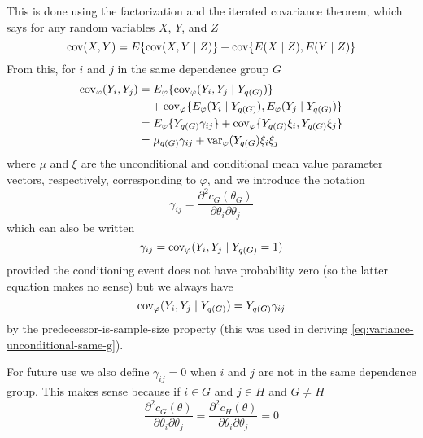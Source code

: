 This is done using the factorization and the iterated covariance theorem,
which says for any random variables $X$, $Y$, and $Z$
$$
   \operatorname{cov}(X, Y) = E\{ \operatorname{cov}(X, Y \mid Z) \} + \operatorname{cov}\{E(X \mid Z), E(Y \mid Z)\}
$$
From this, for $i$ and $j$ in the same dependence group $G$
\begin{equation}
\begin{split} \label{eq:variance-unconditional-same-g}
   \operatorname{cov}_\varphi(Y_i, Y_j)
   & =
   E_\varphi\{ \operatorname{cov}_\varphi(Y_i, Y_j \mid Y_{q(G)}) \}
   \\
   & \quad
   + \operatorname{cov}_\varphi\{E_\varphi(Y_i \mid Y_{q(G)}), E_\varphi(Y_j \mid Y_{q(G)})\}
   \\
   & =
   E_\varphi\{ Y_{q(G)} \gamma_{i j} \}
   + \operatorname{cov}_\varphi\{ Y_{q(G)} \xi_i, Y_{q(G)} \xi_j\}
   \\
   & =
   \mu_{q(G)} \gamma_{i j} + \operatorname{var}_\varphi(Y_{q(G}) \xi_i \xi_j
\end{split}
\end{equation}
where $\mu$ and $\xi$ are the unconditional and conditional mean value
parameter vectors, respectively, corresponding to $\varphi$, and we introduce
the notation
$$
   \gamma_{i j}
   =
   \frac{\partial^2 c_G(\theta_G)}{\partial \theta_i \partial \theta_j}
$$
which can also be written
\begin{equation} \label{eq:sigma}
   \gamma_{i j}
   =
   \operatorname{cov}_\varphi(Y_i, Y_j \mid Y_{q(G)} = 1)
\end{equation}
provided the conditioning event does not have probability zero (so the
latter equation makes no sense) but we always have
$$
   \operatorname{cov}_\varphi(Y_i, Y_j \mid Y_{q(G)} ) = Y_{q(G)} \gamma_{i j}
$$
by the predecessor-is-sample-size property
(this was used in deriving \eqref{eq:variance-unconditional-same-g}).

For future use we also define $\gamma_{i j} = 0$ when $i$ and $j$ are
not in the same dependence group.  This makes sense because if $i \in G$
and $j \in H$ and $G \neq H$
$$
   \frac{\partial^2 c_G(\theta)}{\partial \theta_i \partial \theta_j}
   =
   \frac{\partial^2 c_H(\theta)}{\partial \theta_i \partial \theta_j}
   =
   0
$$

